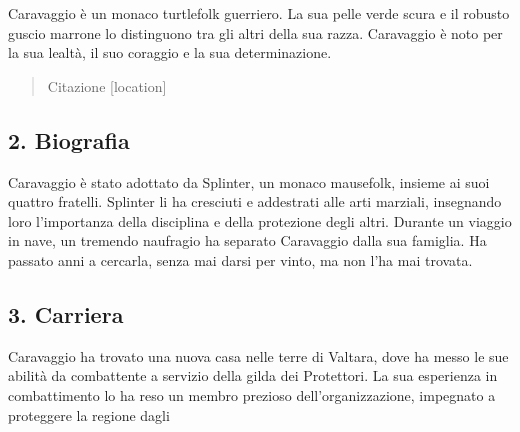 Caravaggio è un monaco turtlefolk guerriero. La sua pelle verde scura e
il robusto guscio marrone lo distinguono tra gli altri della sua razza.
Caravaggio è noto per la sua lealtà, il suo coraggio e la sua
determinazione.

\begin{quote}
Citazione {[}location{]}
\end{quote}

\subsection{2. Biografia}\label{biografia}


Caravaggio è stato adottato da Splinter, un monaco mausefolk, insieme ai
suoi quattro fratelli. Splinter li ha cresciuti e addestrati alle arti
marziali, insegnando loro l'importanza della disciplina e della
protezione degli altri. Durante un viaggio in nave, un tremendo
naufragio ha separato Caravaggio dalla sua famiglia. Ha passato anni a
cercarla, senza mai darsi per vinto, ma non l'ha mai trovata.

\subsection{3. Carriera}\label{carriera}


Caravaggio ha trovato una nuova casa nelle terre di Valtara, dove ha
messo le sue abilità da combattente a servizio della gilda dei
Protettori. La sua esperienza in combattimento lo ha reso un membro
prezioso dell'organizzazione, impegnato a proteggere la regione dagli
